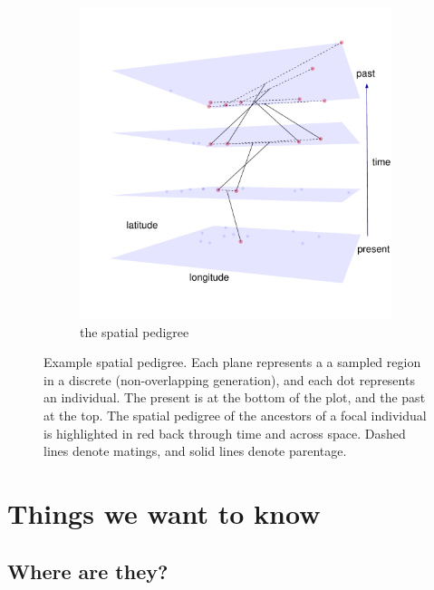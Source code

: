 \documentclass{ar-1col}
\begin{document}
\begin{figure}[ht]
\begin{subfigure}{0.55\textwidth}
        \includegraphics[width=\linewidth]{figs/spatial_pedigree.pdf}
        \caption{the spatial pedigree}
        \label{sp_pedigree}
    \end{subfigure}
        \caption{
            Example spatial pedigree.
                    Each plane represents a a sampled region in a discrete (non-overlapping generation),
                    and each dot represents an individual.
                    The present is at the bottom of the plot, and the past at the top.
                    The spatial pedigree of the ancestors of a focal individual is highlighted in red
                    back through time and across space.
                    Dashed lines denote matings, and solid lines denote parentage.
        }
        \label{spatial_pedigree}
\end{figure}

\section{Things we want to know}

\subsection{Where are they?}
\end{document}
